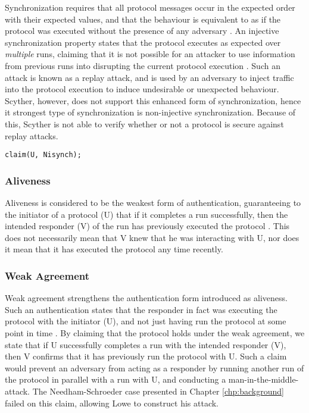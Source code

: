 Synchronization requires that all protocol messages occur in the expected order with their expected values, and that the behaviour is equivalent to as if the protocol was executed without the presence of any adversary \cite{cremers2006injective}. An injective synchronization property states that the protocol executes as expected over \emph{multiple} runs, claiming that it is not possible for an attacker to use information from previous runs into disrupting the current protocol execution \cite{cremers2005operational}. Such an attack is known as a replay attack, and is used by an adversary to inject traffic into the protocol execution to induce undesirable or unexpected behaviour. Scyther, however, does not support this enhanced form of synchronization, hence it strongest type of synchronization is non-injective synchronization. Because of this, Scyther is not able to verify whether or not a protocol is secure against replay attacks.\newline


\begin{lstlisting}
claim(U, Nisynch);
\end{lstlisting}


\subsubsection{Aliveness}

Aliveness is considered to be the weakest form of authentication, guaranteeing to the initiator of a protocol (U) that if it completes a run successfully, then the intended responder (V) of the run has previously executed the protocol \cite{lowe1997hierarchy}. This does not necessarily mean that V knew that he was interacting with U, nor does it mean that it has executed the protocol any time recently. 


\subsubsection{Weak Agreement}

Weak agreement strengthens the authentication form introduced as aliveness. Such an authentication states that the responder in fact was executing the protocol with the initiator (U), and not just having run the protocol at some point in time \cite{lowe1997hierarchy}. By claiming that the protocol holds under the weak agreement, we state that if U successfully completes a run with the intended responder (V), then V confirms that it has previously run the protocol with U. Such a claim would prevent an adversary from acting as a responder by running another run of the protocol in parallel with a run with U, and conducting a man-in-the-middle-attack. The Needham-Schroeder case presented in Chapter \ref{chp:background} failed on this claim, allowing Lowe to construct his attack. 


